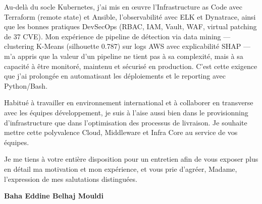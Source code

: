 \documentclass[a4paper,11pt]{article}
\begin{document}
Au-delà du socle Kubernetes, j'ai mis en œuvre l'Infrastructure as Code avec Terraform (remote state) et Ansible, l'observabilité avec ELK et Dynatrace, ainsi que les bonnes pratiques DevSecOps (RBAC, IAM, Vault, WAF, virtual patching de 37 CVE). Mon expérience de pipeline de détection via data mining — clustering K-Means (silhouette 0.787) sur logs AWS avec explicabilité SHAP — m'a appris que la valeur d'un pipeline ne tient pas à sa complexité, mais à sa capacité à être monitoré, maintenu et sécurisé en production. C'est cette exigence que j'ai prolongée en automatisant les déploiements et le reporting avec Python/Bash.

Habitué à travailler en environnement international et à collaborer en transverse avec les équipes développement, je suis à l'aise aussi bien dans le provisionning d'infrastructure que dans l'optimisation des processus de livraison. Je souhaite mettre cette polyvalence Cloud, Middleware et Infra Core au service de vos équipes.

Je me tiens à votre entière disposition pour un entretien afin de vous exposer plus en détail ma motivation et mon expérience, et vous prie d'agréer, Madame, l'expression de mes salutations distinguées.

\vspace{0.8cm}

\begin{flushright}
{\bfseries Baha Eddine Belhaj Mouldi}
\end{flushright}
\end{document}
